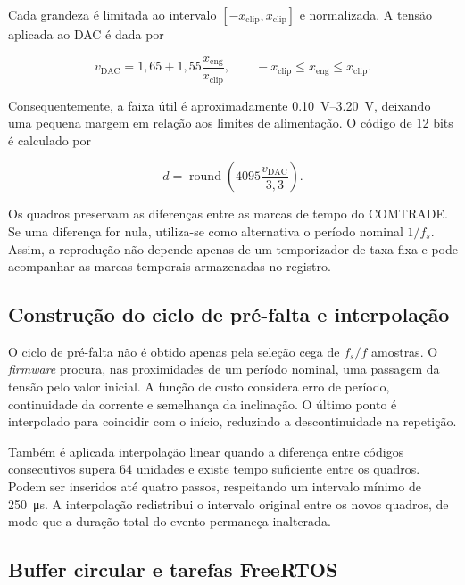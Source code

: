 Cada grandeza é limitada ao intervalo $[-x_{\mathrm{clip}},x_{\mathrm{clip}}]$ e normalizada. A tensão aplicada ao DAC é dada por

\begin{equation}
  v_{\mathrm{DAC}}=1{,}65+1{,}55\frac{x_{\mathrm{eng}}}{x_{\mathrm{clip}}},
  \qquad -x_{\mathrm{clip}}\leq x_{\mathrm{eng}}\leq x_{\mathrm{clip}}.
  \label{eq:mapeamento-dac}
\end{equation}

Consequentemente, a faixa útil é aproximadamente \SIrange{0,10}{3,20}{\volt}, deixando uma pequena margem em relação aos limites de alimentação. O código de 12 bits é calculado por

\begin{equation}
  d=\operatorname{round}\left(4095\frac{v_{\mathrm{DAC}}}{3{,}3}\right).
\end{equation}

Os quadros preservam as diferenças entre as marcas de tempo do COMTRADE. Se uma diferença for nula, utiliza-se como alternativa o período nominal $1/f_s$. Assim, a reprodução não depende apenas de um temporizador de taxa fixa e pode acompanhar as marcas temporais armazenadas no registro.

\subsection{Construção do ciclo de pré-falta e interpolação}

O ciclo de pré-falta não é obtido apenas pela seleção cega de $f_s/f$ amostras. O \textit{firmware} procura, nas proximidades de um período nominal, uma passagem da tensão pelo valor inicial. A função de custo considera erro de período, continuidade da corrente e semelhança da inclinação. O último ponto é interpolado para coincidir com o início, reduzindo a descontinuidade na repetição.

Também é aplicada interpolação linear quando a diferença entre códigos consecutivos supera 64 unidades e existe tempo suficiente entre os quadros. Podem ser inseridos até quatro passos, respeitando um intervalo mínimo de \SI{250}{\micro\second}. A interpolação redistribui o intervalo original entre os novos quadros, de modo que a duração total do evento permaneça inalterada.

\subsection{Buffer circular e tarefas FreeRTOS}


